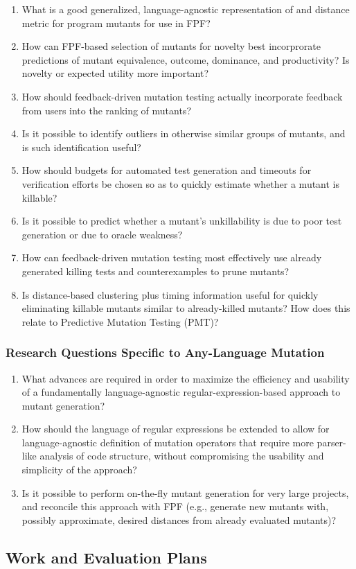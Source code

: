 \begin{enumerate}
\item What is a good generalized, language-agnostic representation
  of and distance metric for program mutants for use in FPF?
\item How can FPF-based selection of mutants for novelty best incorprorate
  predictions of mutant equivalence, outcome, dominance, and
  productivity?  Is novelty or expected utility more important?
\item How should feedback-driven mutation testing actually incorporate feedback from users into the 
  ranking of mutants? 
\item Is it possible to identify outliers in otherwise similar groups of
  mutants, and is such identification useful?
\item How should budgets for automated test generation and
  timeouts for verification efforts be chosen so as to quickly estimate whether a
  mutant is killable?
\item Is it possible to predict whether a mutant's unkillability is due to poor test 
  generation  or due to oracle weakness? 
\item How can feedback-driven mutation testing most effectively use already generated killing tests
  and counterexamples to prune mutants?
\item Is distance-based clustering plus timing information useful for quickly
  eliminating killable mutants similar to already-killed mutants?  How
  does this relate to Predictive Mutation Testing (PMT)?

\end{enumerate}

\subsubsection{Research Questions Specific to Any-Language Mutation}

\begin{enumerate}
\item What advances are required in order to maximize the efficiency and usability of a
  fundamentally language-agnostic regular-expression-based approach to
  mutant generation?
\item How should the language of regular expressions be extended to allow
  for language-agnostic definition of mutation operators that require
  more parser-like analysis of code structure, without compromising
  the usability and simplicity of the approach?
\item Is it possible to perform on-the-fly mutant generation for very
  large projects, and reconcile this approach with FPF (e.g., generate
  new mutants with, possibly approximate, desired distances from
  already evaluated mutants)?
\end{enumerate}

\subsection{Work and Evaluation Plans}
\label{sec:workplan}

